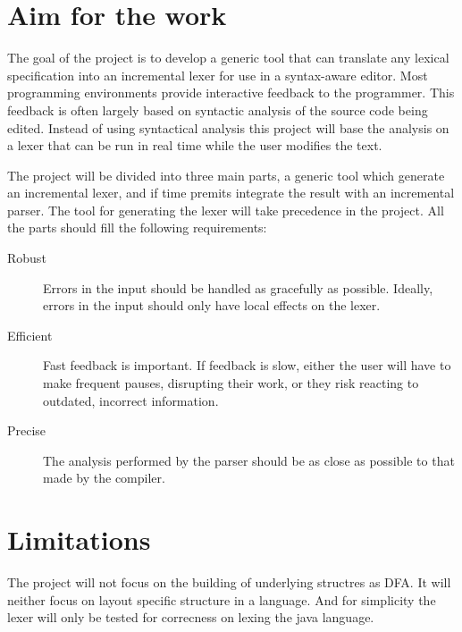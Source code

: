 \documentclass[11pt,a4paper]{article}
\begin{document}
\section{Aim for the work}
The goal of the project is to develop a generic tool that can translate
any lexical specification into an incremental lexer for use in a syntax-aware
editor. Most programming environments provide
interactive feedback to the programmer. This feedback is often largely based on
syntactic analysis of the source code being edited. Instead of using syntactical
analysis this project will base the analysis on a lexer that can be run in real
time while the user modifies the text.

The project will be divided into three main parts, a generic tool which generate
an incremental lexer, and if time premits
integrate the result with an incremental parser. The tool for generating the
lexer will take precedence in the project. All the parts should fill the
following requirements:
\begin{description}
    \item[Robust]
            Errors in the input should be handled as gracefully as 
            possible. Ideally, errors in the input should only have local 
            effects on the lexer. 
    \item[Efficient]
            Fast feedback is important. If feedback is slow, either the user 
            will have to make frequent pauses, disrupting their work, or they 
            risk reacting to outdated, incorrect information.
    \item[Precise]
            The analysis performed by the parser should be as close as possible 
            to that made by the compiler.
\end{description}

\section{Limitations}
The project will not focus on the building of underlying structres as DFA.
It will neither focus on layout specific structure in a language. 
And for simplicity the lexer will only be tested for correcness on lexing the
java language.
\end{document}
